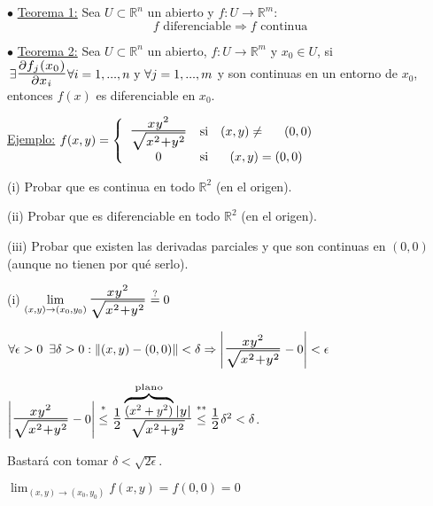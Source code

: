 \documentclass[10pt, titlepage]{article}
\newcommand{\eqc}[1]{\stackrel{\mathclap{\normalfont\mbox{\scriptsize{#1}}}}{=}}
\newcommand{\leqc}[1]{\stackrel{\mathclap{\normalfont\mbox{\scriptsize{#1}}}}{\leq}}
\newcommand{\R}{\mathbb{R}}
\newcommand{\bfrac}[2]{\scalebox{1.4}{$\frac{#1}{#2}$}}
\newcommand{\spac}{\, \, \,}
\newcommand{\teorema}[1][\!\!]{\noindent$\bullet$ \underline{Teorema #1:} }
\begin{document}
\teorema[1] Sea $U \subset \R^n$ un abierto y $f : U \to \R^m$: 
\[
\boxed{
f \text{ diferenciable} \Rightarrow f \text{ continua}
}
\]
\vspace{5mm}

\teorema[2] Sea $U \subset \R^n$ un abierto, $f : U \to \R^m$ y $x_0 \in U$, si $\, \exists \bfrac{\partial f_j 
(x_0)}{\partial x_i} \\ \forall i =1,..., n \text{ y } \forall  j = 1,..., m$ y son continuas en un entorno de 
$x_0$, entonces $f (x)$ es diferenciable en $x_0$.
\vspace{3mm}

\underline{Ejemplo:} $f (x, y) = \left \{
\begin{array}{ccc}

\bfrac{xy^2}{\sqrt{x^2 + y^2}} & \text{si} & (x , y) \neq \indent (0, 0)\\
0 & \text{si} & (x, y) = (0, 0)\\

\end{array}\right .
$
\vspace{3mm}

(i) Probar que es continua en todo $\R^2$ (en el origen).

(ii) Probar que es diferenciable en todo $\R^2$ (en el origen).

(iii) Probar que existen las derivadas parciales y que son continuas en $(0, 0)$ \\ \indent (aunque no tienen 
por qué serlo).
\vspace{3mm}

(i) $\displaystyle \lim_{(x, y) \to (x_0, y_0)} \bfrac{xy^2}{\sqrt{x^2 + y^2}} \eqc{?} 0$

$\forall \epsilon > 0 \spac \exists \delta > 0 : \|(x , y) - (0, 0)\| < \delta \Rightarrow \left | \bfrac{xy^2}{\sqrt
{x^2 + y^2}} - 0 \right | < \epsilon$
\vspace{3mm}

$\left | \bfrac{xy^2}{\sqrt{x^2 + y^2}} - 0 \right | \leqc{*} \bfrac{1}{2} \bfrac{\overbrace{\scalebox{0.7}{$(x^2 + y^2)$}}^{\text{plano}}|y|}{\sqrt{x^2 + y^2}} \leqc{**} \bfrac{1}{2} \delta^2 < \delta$. 
\vspace{3mm}

Bastará con tomar $\delta < \sqrt{2 \epsilon}$.
\vspace{3mm}

$\displaystyle \lim_{(x, y) \to (x_0, y_0)} f (x, y) = f (0, 0) = 0$
\vspace{3mm}
\end{document}
